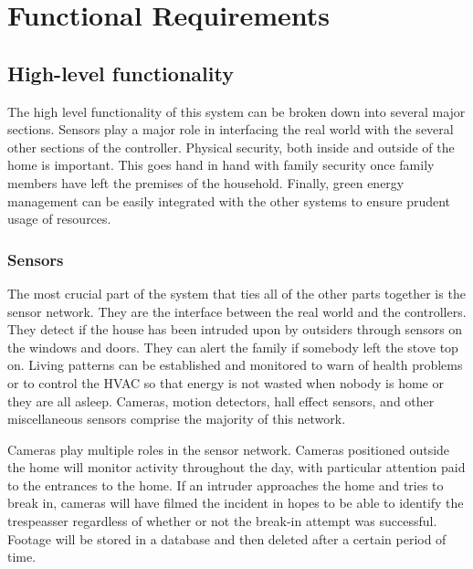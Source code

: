 \documentclass{report}
\begin{document}

\chapter{Functional Requirements}

\section{High-level functionality}
The high level functionality of this system can be broken down into several
major sections. Sensors play a major role in interfacing the real world with
the several other sections of the controller. Physical security, both inside
and outside of the home is important. This goes hand in hand with family
security once family members have left the premises of the household. Finally,
green energy management can be easily integrated with the other systems to
ensure prudent usage of resources. 

\subsection{Sensors}

The most crucial part of the system that ties all of the other parts together
is the sensor network. They are the interface between the real world and the
controllers. They detect if the house has been intruded upon by outsiders
through sensors on the windows and doors. They can alert the family if somebody
left the stove top on. Living patterns can be established and monitored to warn
of health problems or to control the HVAC so that energy is not wasted when
nobody is home or they are all asleep. Cameras, motion detectors, hall effect
sensors, and other miscellaneous sensors comprise the majority of this network.

Cameras play multiple roles in the sensor network. Cameras positioned outside
the home will monitor activity throughout the day, with particular attention paid
to the entrances to the home. If an intruder approaches the home and tries to
break in, cameras will have filmed the incident in hopes to be able to identify
the trespeasser regardless of whether or not the break-in attempt was successful.
Footage will be stored in a database and then deleted after a certain period of
time.
\end{document}
